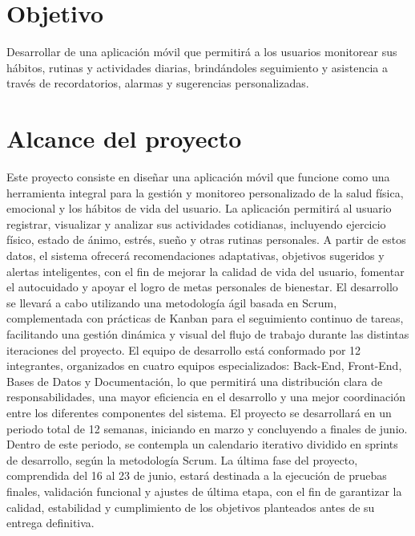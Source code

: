 \documentclass[letterpaper,12pt,oneside]{article}
\begin{document}
    \section{Objetivo}
        Desarrollar de una aplicación móvil que permitirá a los usuarios monitorear sus hábitos, rutinas y actividades diarias, brindándoles seguimiento y asistencia a través de recordatorios, alarmas y sugerencias personalizadas.
    \section{Alcance del proyecto}
        Este proyecto consiste en diseñar una aplicación móvil que funcione como una herramienta integral para la gestión y monitoreo personalizado de la salud física, emocional y los hábitos de vida del usuario. La aplicación permitirá al usuario registrar, visualizar y analizar sus actividades cotidianas, incluyendo ejercicio físico, estado de ánimo, estrés, sueño y otras rutinas personales. A partir de estos datos, el sistema ofrecerá recomendaciones adaptativas, objetivos sugeridos y alertas inteligentes, con el fin de mejorar la calidad de vida del usuario, fomentar el autocuidado y apoyar el logro de metas personales de bienestar.
        \newline \newline
        El desarrollo se llevará a cabo utilizando una metodología ágil basada en Scrum, complementada con prácticas de Kanban para el seguimiento continuo de tareas, facilitando una gestión dinámica y visual del flujo de trabajo durante las distintas iteraciones del proyecto.
        \newline \newline
        El equipo de desarrollo está conformado por 12 integrantes, organizados en cuatro equipos especializados: Back-End, Front-End, Bases de Datos y Documentación, lo que permitirá una distribución clara de responsabilidades, una mayor eficiencia en el desarrollo y una mejor coordinación entre los diferentes componentes del sistema.
        \newline \newline
        El proyecto se desarrollará en un periodo total de 12 semanas, iniciando en marzo y concluyendo a finales de junio. Dentro de este periodo, se contempla un calendario iterativo dividido en sprints de desarrollo, según la metodología Scrum. La última fase del proyecto, comprendida del 16 al 23 de junio, estará destinada a la ejecución de pruebas finales, validación funcional y ajustes de última etapa, con el fin de garantizar la calidad, estabilidad y cumplimiento de los objetivos planteados antes de su entrega definitiva.
\end{document}
